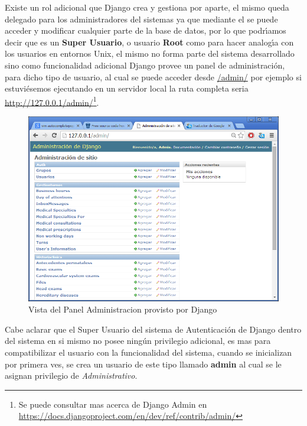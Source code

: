 Existe un rol adicional que Django crea y gestiona por aparte, el mismo queda 
delegado para los administradores del sistemas ya que mediante el se puede acceder
y modificar cualquier parte de la base de datos, por lo que podr\'{\i}amos decir que 
es un \textbf{Super Usuario}, o usuario \textbf{Root} como para hacer analog\'{\i}a
con los usuarios en entornos Unix, el mismo no forma parte del sistema desarrollado
sino como funcionalidad adicional Django provee un panel de administraci\'on, 
para dicho tipo de usuario, al cual se puede acceder desde \url{/admin/} por ejemplo
si estuvi\'esemos ejecutando en un servidor local la ruta completa seria 
\url{http://127.0.0.1/admin/}\footnote{Se puede consultar mas acerca de Django
Admin en \url{https://docs.djangoproject.com/en/dev/ref/contrib/admin/}}.\\[0.1cm]


\begin{figure}[h]
    \centering
    \includegraphics[scale=0.5]{resourse/django-admin.png}
    \caption{Vista del Panel Administracion provisto por Django}
    \label{fig:123}
\end{figure}  


Cabe aclarar que el Super Usuario del sistema de Autenticaci\'on de Django dentro 
del sistema en si mismo no posee ning\'un privilegio adicional, es mas para 
compatibilizar el usuario con la funcionalidad del sistema, cuando se inicializan
por primera ves, se crea un usuario de este tipo llamado \textbf{admin} al cual
se le asignan privilegio de \textit{Administrativo}.



